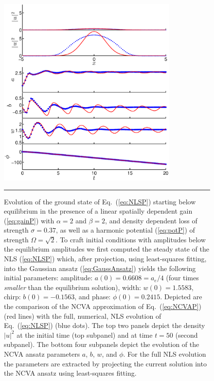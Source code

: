{\begin{figure}[htbp]
\centering
\centerline{\includegraphics[width=0.8\textwidth]{Figures/Fig3a_P4_increase_v2.eps}}
  \rule{35em}{0.5pt}
\caption[Exciton-Polariton Above Equilibrium]{Evolution of the ground state of Eq.~(\ref{eq:NLSP}) starting below equilibrium in the presence of a linear spatially dependent gain (\ref{eq:gainP}) with
$\alpha =2$ and $\beta=2$, and density dependent loss of strength 
$\sigma =0.37$, as well as a harmonic potential (\ref{eq:potP}) 
of strength $\Omega = \sqrt{2}$.
%
To craft initial conditions with amplitudes below the equilibrium amplitudes we first computed the
steady state of the NLS (\ref{eq:NLSP}) which,
after projection, using least-squares fitting, into the Gaussian ansatz 
(\ref{eq:GaussAnsatz}) yields the following initial parameters:
amplitude: $a(0)= 0.6608 = a_e/4$ (four times {\em smaller} than the equilibrium solution), width:  $w(0)=1.5583$, chirp: $b(0) = -0.1563$, and phase: $\phi(0)=0.2415$.
%
Depicted are the comparison of the NCVA approximation of Eq.~(\ref{eq:NCVAP})
(red lines) with the full, numerical, NLS evolution of Eq.~(\ref{eq:NLSP})
(blue dots).
%
The top two panels depict the density $|u|^2$ at the initial time (top subpanel)
and at time $t=50$ (second subpanel).
%
The bottom four subpanels depict the evolution of the NCVA ansatz parameters
$a$, $b$, $w$, and $\phi$. For the full NLS evolution the parameters are
extracted by projecting the current solution into the NCVA ansatz using 
least-squares fitting.
\label{fig4}}
\end{figure}

}
